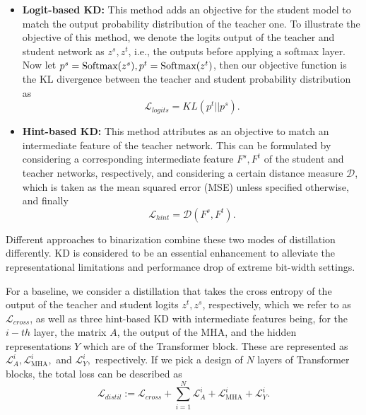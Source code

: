 \begin{itemize}
    \item \textbf{Logit-based KD:} This method adds an objective for the student model to match the output probability distribution of the teacher one. To illustrate the objective of this method, we denote the logits output of the teacher and student network as $z^s, z^t$, i.e., the outputs before applying a softmax layer. Now let $p^s = \text{Softmax}(z^s), p^t = \text{Softmax}(z^t)$, then our objective function is the KL divergence between the teacher and student probability distribution as
    \begin{equation}
        \mathcal{L}_{logits} = KL ( p^t || p^s).
    \end{equation}

    \item \textbf{Hint-based KD:} This method attributes as an objective to match an intermediate feature of the teacher network. This can be formulated by considering a corresponding intermediate feature $F^s, F^t$ of the student and teacher networks, respectively, and considering a certain distance measure $\mathcal{D}$, which is taken as the mean squared error (MSE) unless specified otherwise, and finally
    \begin{equation}
        \mathcal{L}_{hint} = \mathcal{D}(F^s, F^t).
    \end{equation}
\end{itemize}

Different approaches to binarization combine these two modes of distillation differently. KD is considered to be an essential enhancement to alleviate the representational limitations and performance drop of extreme bit-width settings. 

For a baseline, we consider a distillation that takes the cross entropy of the output of the teacher and student logits $z^t, z^s$, respectively, which we refer to as $\mathcal{L}_{cross}$, as well as three hint-based KD with intermediate features being, for the $i-th$ layer, the matrix $A$, the output of the MHA, and the hidden representations $Y$ which are of the Transformer block. These are represented as $\mathcal{L}^i_{A}, \mathcal{L}^i_{\text{MHA}}, $ and $ \mathcal{L}^i_{Y},$ respectively.
If we pick a design of $N$ layers of Transformer blocks, the total loss can be described as
\begin{equation}
    \mathcal{L}_{distil} := \mathcal{L}_{cross} + \sum_{i=1}^N \mathcal{L}^i_{A} + \mathcal{L}^i_{\text{MHA}} + \mathcal{L}^i_{Y}.
\end{equation}

